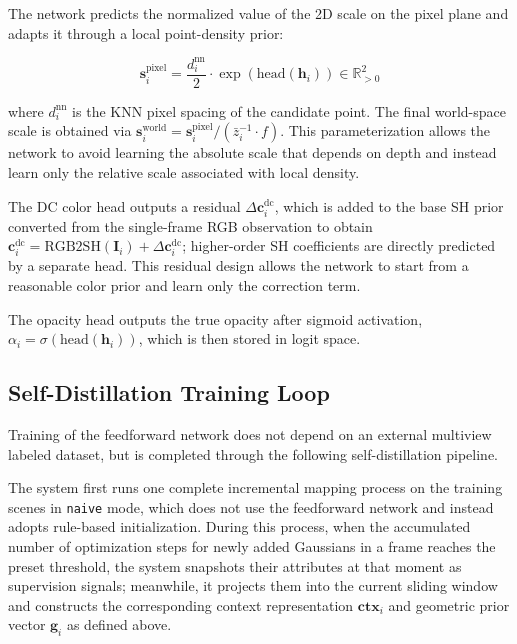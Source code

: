 \documentclass[lettersize,journal]{IEEEtran}
\begin{document}
 The network predicts the normalized value of the 2D scale on the pixel plane and adapts it through a local point-density prior:

\begin{equation}
\mathbf{s}_i^{\text{pixel}} = \frac{d_i^{\text{nn}}}{2} \cdot \exp(\text{head}(\mathbf{h}_i)) \in \mathbb{R}^2_{>0}
\end{equation}

where $d_i^{\text{nn}}$ is the KNN pixel spacing of the candidate point. The final world-space scale is obtained via $\mathbf{s}_i^{\text{world}} = \mathbf{s}_i^{\text{pixel}} / (\bar{z}_i^{-1} \cdot f)$. This parameterization allows the network to avoid learning the absolute scale that depends on depth and instead learn only the relative scale associated with local density.

 The DC color head outputs a residual $\Delta \mathbf{c}_i^{\text{dc}}$, which is added to the base SH prior converted from the single-frame RGB observation to obtain $\mathbf{c}_i^{\text{dc}} = \text{RGB2SH}(\mathbf{I}_i) + \Delta \mathbf{c}_i^{\text{dc}}$; higher-order SH coefficients are directly predicted by a separate head. This residual design allows the network to start from a reasonable color prior and learn only the correction term.

 The opacity head outputs the true opacity after sigmoid activation, $\alpha_i = \sigma(\text{head}(\mathbf{h}_i))$, which is then stored in logit space.

\subsection{Self-Distillation Training Loop}

Training of the feedforward network does not depend on an external multiview labeled dataset, but is completed through the following self-distillation pipeline.

 The system first runs one complete incremental mapping process on the training scenes in \texttt{naive} mode, which does not use the feedforward network and instead adopts rule-based initialization. During this process, when the accumulated number of optimization steps for newly added Gaussians in a frame reaches the preset threshold, the system snapshots their attributes at that moment as supervision signals; meanwhile, it projects them into the current sliding window and constructs the corresponding context representation $\mathbf{ctx}_i$ and geometric prior vector $\mathbf{g}_i$ as defined above.
\end{document}
